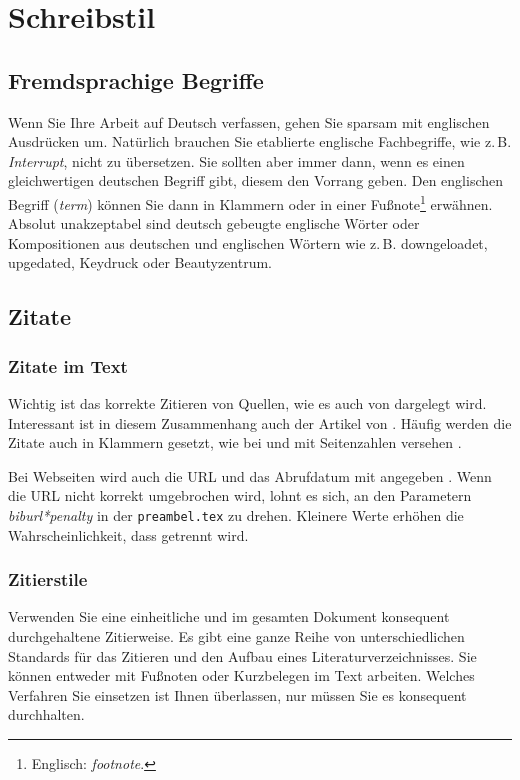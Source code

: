 \chapter{Schreibstil}

\section{Fremdsprachige Begriffe}

Wenn Sie Ihre Arbeit auf Deutsch verfassen, gehen Sie sparsam mit englischen Ausdrücken um. Natürlich brauchen Sie etablierte englische Fachbegriffe, wie z.\,B. \textit{Interrupt}, nicht zu übersetzen. Sie sollten aber immer dann, wenn es einen gleichwertigen deutschen Begriff gibt, diesem den Vorrang geben. Den englischen Begriff (\textit{term}) können Sie dann in Klammern oder in einer Fußnote\footnote{Englisch: \textit{footnote}.} erwähnen. Absolut unakzeptabel sind deutsch gebeugte englische Wörter oder Kompositionen aus deutschen und englischen Wörtern wie z.\,B. downgeloadet, upgedated, Keydruck oder Beautyzentrum.


\section{Zitate}

\subsection{Zitate im Text}

Wichtig ist das korrekte Zitieren von Quellen, wie es auch von \cite{Kornmeier2011} dargelegt wird. Interessant ist in diesem Zusammenhang auch der Artikel von \cite{Kramer2009}. Häufig werden die Zitate auch in Klammern gesetzt, wie bei \parencite{Kornmeier2011} und mit Seitenzahlen versehen \parencite[S. 22--24]{Kornmeier2011}.

Bei Webseiten wird auch die URL und das Abrufdatum mit angegeben \parencite{Gao2017}. Wenn die URL nicht korrekt umgebrochen wird, lohnt es sich, an den Parametern \textit{biburl*penalty} in der \texttt{preambel.tex} zu drehen. Kleinere Werte erhöhen die Wahrscheinlichkeit, dass getrennt wird.

\subsection{Zitierstile}

Verwenden Sie eine einheitliche und im gesamten Dokument konsequent durchgehaltene Zitierweise. Es gibt eine ganze Reihe von unterschiedlichen Standards für das Zitieren und den Aufbau eines Literaturverzeichnisses. Sie können entweder mit Fußnoten oder Kurzbelegen im Text arbeiten. Welches Verfahren Sie einsetzen ist Ihnen überlassen, nur müssen Sie es konsequent durchhalten.


